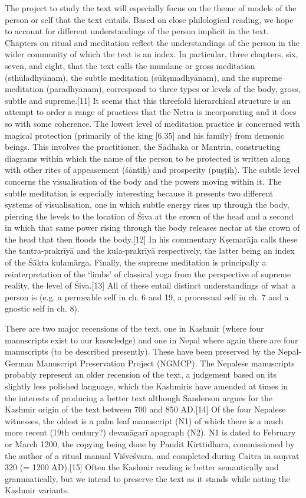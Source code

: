 The project to study the text will especially focus on the theme of models of the person or self that the text entails. Based on close philological reading, we hope to account for different understandings of the person implicit in the text. Chapters on ritual and meditation reflect the understandings of the person in the wider community of which the text is an index. In particular, three chapters, six, seven, and eight, that the text calls the mundane or gross meditation (sthūladhyānam), the subtle meditation (sūkṣmadhyānam), and the supreme meditation (para­dhyānam), correspond to three types or levels of the body, gross, subtle and supreme.[11] It seems that this threefold hierarchical structure is an attempt to order a range of practices that the Netra is incorporating and it does so with some coherence. The lowest level of meditation practice is concerned with magical protection (primarily of the king [6.35] and his family) from demonic beings. This involves the practitioner, the Sādhaka or Mantrin, constructing diagrams within which the name of the person to be protected is written along with other rites of appeasement (śāntiḥ) and prosperity (puṣṭiḥ). The subtle level concerns the visualisation of the body and the powers moving within it. The subtle meditation is especially interesting because it presents two different systems of visualisation, one in which subtle energy rises up through the body, piercing the levels to the location of Śiva at the crown of the head and a second in which that same power rising through the body releases nectar at the crown of the head that then floods the body.[12] In his commentary Kṣemarāja calls these the tantra-prakrīyā and the kula-prakrīyā respectively, the latter being an index of the Śākta kulamārga. Finally, the supreme meditation is principally a reinterpretation of the ‘limbs’ of classical yoga from the perspective of supreme reality, the level of Śiva.[13] All of these entail distinct understandings of what a person is (e.g. a permeable self in ch. 6 and 19, a processual self in ch. 7 and a gnostic self in ch. 8).

There are two major recensions of the text, one in Kashmir (where four manuscripts exist to our knowledge) and one in Nepal where again there are four manuscripts (to be described presently). These have been preserved by the Nepal-German Manuscript Preservation Project (NGMCP). The Nepalese manuscripts probably represent an older recension of the text, a judgement based on its slightly less polished language, which the Kashmiris have amended at times in the interests of producing a better text although Sanderson argues for the Kashmir origin of the text between 700 and 850 AD.[14] Of the four Nepalese witnesses, the oldest is a palm leaf manuscript (N1) of which there is a much more recent (19th century?) devanāgarī apograph (N2). N1 is dated to February or March 1200, the copying being done by Pandit Kīrttidhara, commissioned by the author of a ritual manual Viśveśvara, and completed during Caitra in saṃvat 320 (= 1200 AD).[15] Often the Kashmir reading is better semantically and grammatically, but we intend to preserve the text as it stands while noting the Kashmir variants.

